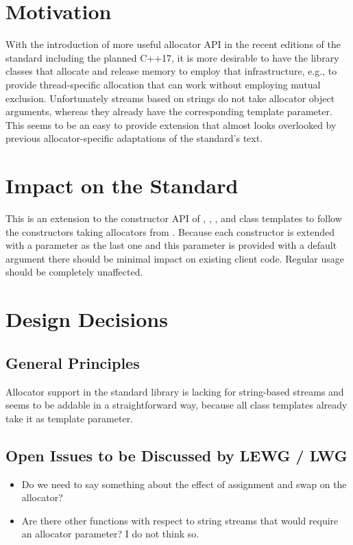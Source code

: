 \documentclass[ebook,11pt,article]{memoir}
\begin{document}
\chapter{Motivation}
With the introduction of more useful allocator API in the recent editions of the standard including the planned C++17, it is more desirable to have the library classes that allocate and release memory to employ that infrastructure, e.g., to provide thread-specific allocation that can work without employing mutual exclusion. Unfortunately streams based on strings do not take allocator object arguments, whereas they already have the corresponding template parameter. This seems to be an easy to provide extension that almost looks overlooked by previous allocator-specific adaptations of the standard's text.
\begin{codeblock}
\end{codeblock}

\chapter{Impact on the Standard}
This is an extension to the constructor API of , , , and  class templates to follow the constructors taking allocators from . Because each constructor is extended with a parameter as the last one and this parameter is provided with a default argument there should be minimal impact on existing client code. Regular usage should be completely unaffected. 

\chapter{Design Decisions}
\section{General Principles}
Allocator support in the standard library is lacking for string-based streams and seems to be addable in a straightforward way, because all class templates already take it as template parameter.
\section{Open Issues to be Discussed by LEWG / LWG}
\begin{itemize}
\item Do we need to say something about the effect of assignment and swap on the allocator?
\item Are there other functions with respect to string streams that would require an allocator parameter? I do not think so.
\end{itemize}
\end{document}

